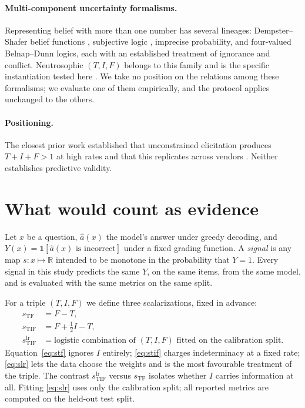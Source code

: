 \documentclass[11pt]{article}
\begin{document}
\paragraph{Multi-component uncertainty formalisms.}
Representing belief with more than one number has several lineages: Dempster--Shafer belief
functions \citep{shafer1976mathematical}, subjective logic \citep{josang2016subjective}, imprecise
probability, and four-valued Belnap--Dunn logics, each with an established treatment of ignorance
and conflict. Neutrosophic $(T,I,F)$ belongs to this family and is the specific instantiation
tested here \citep{leyva2026breaking}. We take no position on the relations among these
formalisms; we evaluate one of them empirically, and the protocol applies unchanged to the others.

\paragraph{Positioning.} The closest prior work established that unconstrained elicitation
produces $T+I+F>1$ at high rates and that this replicates across vendors
\citep{leyva2026breaking,mason2026tensors}. Neither establishes predictive validity.

\section{What would count as evidence}
\label{sec:evidence}

Let $x$ be a question, $\hat{a}(x)$ the model's answer under greedy decoding, and
$Y(x)=\mathbb{1}[\hat{a}(x)\text{ is incorrect}]$ under a fixed grading function. A \emph{signal}
is any map $s:x\mapsto\mathbb{R}$ intended to be monotone in the probability that $Y=1$. Every
signal in this study predicts the same $Y$, on the same items, from the same model, and is
evaluated with the same metrics on the same split.

For a triple $(T,I,F)$ we define three scalarizations, fixed in advance:
\begin{align}
s_{\mathrm{TF}} &= F - T, \label{eq:stf}\\
s_{\mathrm{TIF}} &= F + \tfrac{1}{2} I - T, \label{eq:stif}\\
s_{\mathrm{TIF}}^{\mathrm{lr}} &= \text{logistic combination of } (T,I,F) \text{ fitted on the calibration split.} \label{eq:slr}
\end{align}
Equation~\eqref{eq:stf} ignores $I$ entirely; \eqref{eq:stif} charges indeterminacy at a fixed
rate; \eqref{eq:slr} lets the data choose the weights and is the most favourable treatment of the
triple. The contrast $s_{\mathrm{TIF}}^{\mathrm{lr}}$ versus $s_{\mathrm{TF}}$ isolates whether
$I$ carries information at all. Fitting \eqref{eq:slr} uses only the calibration split; all
reported metrics are computed on the held-out test split.
\end{document}
